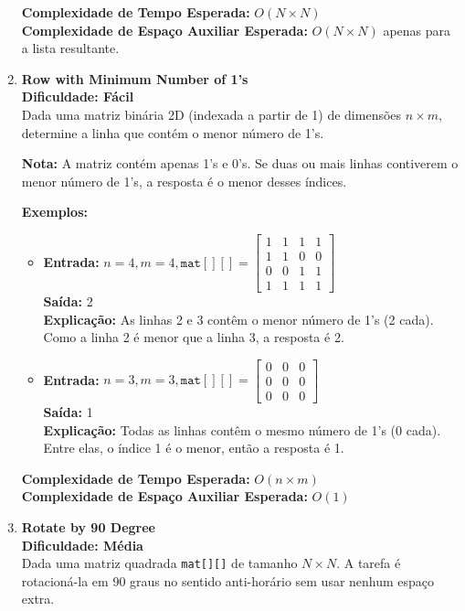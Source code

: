 \documentclass[a4paper,12pt]{article}
\begin{document}
\begin{enumerate}
    \textbf{Complexidade de Tempo Esperada:} \( O(N \times N) \) \\
    \textbf{Complexidade de Espaço Auxiliar Esperada:} \( O(N \times N) \) apenas para a lista resultante.

    \item \textbf{Row with Minimum Number of 1's} \\
\textbf{Dificuldade: Fácil} \\
Dada uma matriz binária 2D (indexada a partir de 1) de dimensões \( n \times m \), determine a linha que contém o menor número de 1's. 

\textbf{Nota:} A matriz contém apenas 1's e 0's. Se duas ou mais linhas contiverem o menor número de 1's, a resposta é o menor desses índices.

\textbf{Exemplos:}
\begin{itemize}
    \item \textbf{Entrada:} \( n = 4, m = 4, \texttt{mat}[][] = \begin{bmatrix}1 & 1 & 1 & 1\\1 & 1 & 0 & 0\\0 & 0 & 1 & 1\\1 & 1 & 1 & 1\end{bmatrix} \) \\
    \textbf{Saída:} 2 \\
    \textbf{Explicação:} As linhas 2 e 3 contêm o menor número de 1's (2 cada). Como a linha 2 é menor que a linha 3, a resposta é 2.
    
    \item \textbf{Entrada:} \( n = 3, m = 3, \texttt{mat}[][] = \begin{bmatrix}0 & 0 & 0\\0 & 0 & 0\\0 & 0 & 0\end{bmatrix} \) \\
    \textbf{Saída:} 1 \\
    \textbf{Explicação:} Todas as linhas contêm o mesmo número de 1's (0 cada). Entre elas, o índice 1 é o menor, então a resposta é 1.
\end{itemize}

\textbf{Complexidade de Tempo Esperada:} \( O(n \times m) \) \\
\textbf{Complexidade de Espaço Auxiliar Esperada:} \( O(1) \)

\item \textbf{Rotate by 90 Degree} \\
\textbf{Dificuldade: Média} \\
Dada uma matriz quadrada \texttt{mat[][]} de tamanho \( N \times N \). A tarefa é rotacioná-la em 90 graus no sentido anti-horário sem usar nenhum espaço extra.


\end{enumerate}
\end{document}
